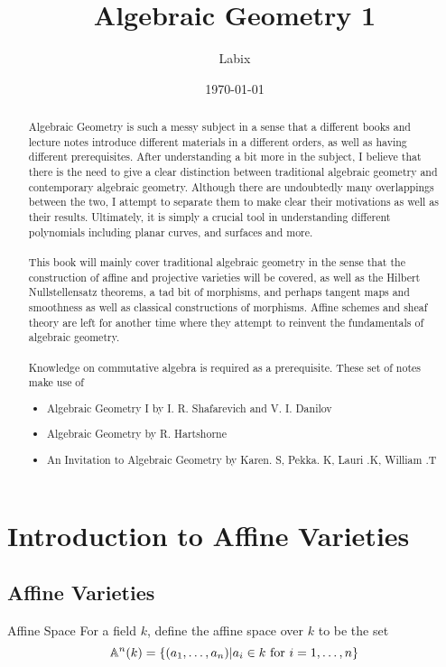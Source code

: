 \documentclass[a4paper]{article}
\title{Algebraic Geometry 1}
\author{Labix}
\date{\today}
\begin{document}
\maketitle
\begin{abstract}
Algebraic Geometry is such a messy subject in a sense that a different books and lecture notes introduce different materials in a different orders, as well as having different prerequisites. After understanding a bit more in the subject, I believe that there is the need to give a clear distinction between traditional algebraic geometry and contemporary algebraic geometry. Although there are undoubtedly many overlappings between the two, I attempt to separate them to make clear their motivations as well as their results. Ultimately, it is simply a crucial tool in understanding different polynomials including planar curves, and surfaces and more. \\~\\

This book will mainly cover traditional algebraic geometry in the sense that the construction of affine and projective varieties will be covered, as well as the Hilbert Nullstellensatz theorems, a tad bit of morphisms, and perhaps tangent maps and smoothness as well as classical constructions of morphisms. Affine schemes and sheaf theory are left for another time where they attempt to reinvent the fundamentals of algebraic geometry. \\~\\

Knowledge on commutative algebra is required as a prerequisite. These set of notes make use of
\begin{itemize}
\item Algebraic Geometry I by I. R. Shafarevich and V. I. Danilov
\item Algebraic Geometry by R. Hartshorne
\item An Invitation to Algebraic Geometry by Karen. S, Pekka. K, Lauri .K, William .T
\end{itemize}
\end{abstract}
\pagebreak
\tableofcontents
\pagebreak

\section{Introduction to Affine Varieties}
\subsection{Affine Varieties}
\begin{defn}{Affine Space}{} For a field $k$, define the affine space over $k$ to be the set $$\mathbb{A}^n(k)=\{(a_1,\dots,a_n)|a_i\in k\text{ for }i=1,\dots,n\}$$
\end{defn}
\end{document}
